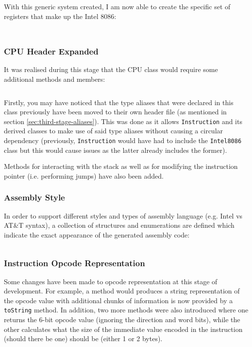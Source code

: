         \inputminted{c++}{code/third/registers.hpp}

        With this generic system created, I am now able to create the specific set of registers that make up the Intel 8086:

        \inputminted{c++}{code/third/registers8086.hpp}

        \inputminted{c++}{code/third/registers8086.cpp}

    \subsubsection{CPU Header Expanded}
        It was realised during this stage that the CPU class would require some additional methods and members:

        \inputminted{c++}{code/third/intel8086.hpp}

        Firstly, you may have noticed that the type aliases that were declared in this class previously have been moved to their own header file (as mentioned in section \ref{sec:third-stage-aliases}). This was done as it allows \texttt{Instruction} and its derived classes to make use of said type aliases without causing a circular dependency (previously, \texttt{Instruction} would have had to include the \texttt{Intel8086} class but this would cause issues as the latter already includes the former).

        Methods for interacting with the stack as well as for modifying the instruction pointer (i.e. performing jumps) have also been added.
    
    \subsubsection{Assembly Style}
        In order to support different styles and types of assembly language (e.g. Intel vs AT\&T syntax), a collection of structures and enumerations are defined which indicate the exact appearance of the generated assembly code:

        \inputminted{c++}{code/third/assembly.hpp}

    \subsubsection{Instruction Opcode Representation}
        Some changes have been made to opcode representation at this stage of development. For example, a method would produces a string representation of the opcode value with additional chunks of information is now provided by a \texttt{toString} method. In addition, two more methods were also introduced where one returns the 6-bit opcode value (ignoring the direction and word bits), while the other calculates what the size of the immediate value encoded in the instruction (should there be one) should be (either 1 or 2 bytes).

